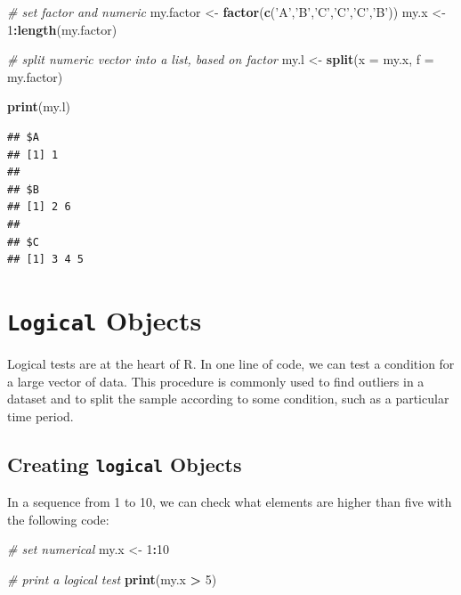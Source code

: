 \documentclass[11pt,]{book}
\newenvironment{Shaded}{\begin{snugshade}}{\end{snugshade}}
\newcommand{\KeywordTok}[1]{\textcolor[rgb]{0.27,0.27,0.27}{\textbf{#1}}}
\newcommand{\DataTypeTok}[1]{\textcolor[rgb]{0.27,0.27,0.27}{#1}}
\newcommand{\DecValTok}[1]{\textcolor[rgb]{0.06,0.06,0.06}{#1}}
\newcommand{\StringTok}[1]{\textcolor[rgb]{0.5,0.5,0.5}{#1}}
\newcommand{\CommentTok}[1]{\textcolor[rgb]{0.56,0.35,0.01}{\textit{#1}}}
\newcommand{\OperatorTok}[1]{\textcolor[rgb]{0.81,0.36,0.00}{\textbf{#1}}}
\newcommand{\NormalTok}[1]{#1}
\begin{document}
\begin{Shaded}
\begin{Highlighting}[]
\CommentTok{# set factor and numeric}
\NormalTok{my.factor <-}\StringTok{ }\KeywordTok{factor}\NormalTok{(}\KeywordTok{c}\NormalTok{(}\StringTok{'A'}\NormalTok{,}\StringTok{'B'}\NormalTok{,}\StringTok{'C'}\NormalTok{,}\StringTok{'C'}\NormalTok{,}\StringTok{'C'}\NormalTok{,}\StringTok{'B'}\NormalTok{))}
\NormalTok{my.x <-}\StringTok{ }\DecValTok{1}\OperatorTok{:}\KeywordTok{length}\NormalTok{(my.factor)}

\CommentTok{# split numeric vector into a list, based on factor}
\NormalTok{my.l <-}\StringTok{ }\KeywordTok{split}\NormalTok{(}\DataTypeTok{x =}\NormalTok{ my.x, }\DataTypeTok{f =}\NormalTok{ my.factor)}

\KeywordTok{print}\NormalTok{(my.l)}
\end{Highlighting}
\end{Shaded}

\begin{verbatim}
## $A
## [1] 1
## 
## $B
## [1] 2 6
## 
## $C
## [1] 3 4 5
\end{verbatim}

\section{\texorpdfstring{\texttt{Logical}
Objects}{Logical Objects}}\label{logical-objects}

Logical tests are at the heart of R. In one line of code, we can test a
condition for a large vector of data. This procedure is commonly used to
find outliers in a dataset and to split the sample according to some
condition, such as a particular time period.

\subsection{\texorpdfstring{Creating \texttt{logical}
Objects}{Creating logical Objects}}\label{creating-logical-objects}

In a sequence from 1 to 10, we can check what elements are higher than
five with the following code:

\begin{Shaded}
\begin{Highlighting}[]
\CommentTok{# set numerical}
\NormalTok{my.x <-}\StringTok{ }\DecValTok{1}\OperatorTok{:}\DecValTok{10}

\CommentTok{# print a logical test}
\KeywordTok{print}\NormalTok{(my.x }\OperatorTok{>}\StringTok{ }\DecValTok{5}\NormalTok{)}
\end{Highlighting}
\end{Shaded}
\end{document}
